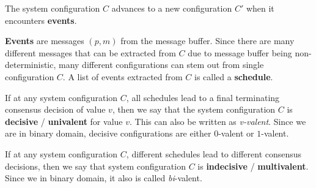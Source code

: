 The system configuration $C$ advances to a new configuration $C'$ when it encounters \textbf{events}. 

\textbf{Events} are messages $(p, m)$ from the message buffer. Since there are many different messages that can be extracted from $C$ due to message buffer being non-deterministic, many different configurations can stem out from single configuration $C$. A list of events extracted from $C$ is called a \textbf{schedule}.

If at any system configuration $C$, all schedules lead to a final terminating consensus decision of value $v$, then we say that the system configuration $C$ is \textbf{decisive} / \textbf{univalent} for value $v$. This can also be written as \emph{v-valent}. Since we are in binary domain, decisive configurations are either $0$-valent or $1$-valent.

If at any system configuration $C$, different schedules lead to different consensus decisions, then we say that system configuration $C$ is \textbf{indecisive} / \textbf{multivalent}. Since we in binary domain, it also is called \emph{bi}-valent.